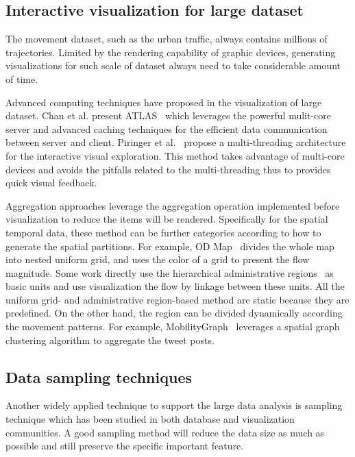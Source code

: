 \subsection{Interactive visualization for large dataset}
The movement dataset, such as the urban traffic, always contains millions of trajectories. Limited by the rendering capability of graphic devices, generating visualizations for such scale of dataset always need to take considerable amount of time. 

Advanced computing techniques have proposed in the visualization of large dataset. Chan et al. present ATLAS~\cite{chan2008maintaining} which leverages the powerful mulit-core server and advanced caching techniques for the efficient data communication between server and client.  Piringer et al.~\cite{piringer2009multi} propose a multi-threading architecture for the interactive visual exploration. This method takes advantage of multi-core devices and avoids the pitfalls related to the multi-threading thus to provides quick visual feedback.  

Aggregation approaches leverage the aggregation operation implemented before visualization to reduce the items will be rendered. Specifically for the spatial temporal data, these method can be further categories according to how to generate the spatial partitions. For example, OD Map~\cite{wood2010visualisation} divides the whole map into nested uniform grid, and uses the color of a grid to present the flow magnitude.     
Some work directly use the hierarchical administrative regions~\cite{guo2009flow} as basic units and use visualization the flow by linkage between these units. All the uniform grid- and administrative region-based method are static because they are predefined. On the other hand, the region can be divided dynamically according the movement patterns. For example, MobilityGraph~\cite{von2015mobilitygraphs} leverages a spatial graph clustering algorithm to aggregate the tweet posts. 



\subsection{Data sampling techniques}
Another widely applied technique to support the large data analysis is sampling technique which has been studied in both database and visualization communities. A good sampling method will reduce the data size as much as possible and still preserve the specific important feature. 

